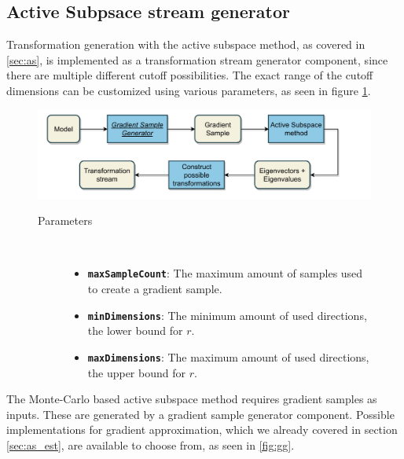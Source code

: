 \documentclass[
  a4paper,  %
  twoside,  %
  bibliography=totoc,
  headsepline,
  cleardoublepage=empty,
  parskip=half,
  draft=false
]{scrbook}
\begin{document}
\subsection{Active Subpsace stream generator}

Transformation generation with the active subspace method, as covered in \cref{sec:as}, is implemented as a transformation stream generator component, since there are multiple different cutoff possibilities.
The exact range of the cutoff dimensions can be customized using various parameters, as seen in figure \cref{fig:astsg}.

\newpage

\begin{mdframed}[style=style,frametitle={Transformation stream generator (active subspaces)}]
\begin{figure}[H]
\vspace{5px}
\includegraphics[width=\textwidth]{graphics/TransformationStreamGen_AS.pdf}

\delimit

\begin{description}
\item[Parameters] {~ \begin{itemize}[\indent{}]
\item \texttt{\textbf{maxSampleCount}}: The maximum amount of samples used to create a gradient sample.
\item \texttt{\textbf{minDimensions}}: The minimum amount of used directions, \ie the lower bound for $r$.
\item \texttt{\textbf{maxDimensions}}: The maximum amount of used directions, \ie the upper bound for $r$.
\end{itemize}}
\end{description}
\delimit
{}
\label{fig:astsg}
\end{figure}
\end{mdframed}
%
The Monte-Carlo based active subspace method requires gradient samples as inputs.
These are generated by a gradient sample generator component.
Possible implementations for gradient approximation, which we already covered in section \cref{sec:as_est}, are available to choose from, as seen in \cref{fig:gg}.
\end{document}
